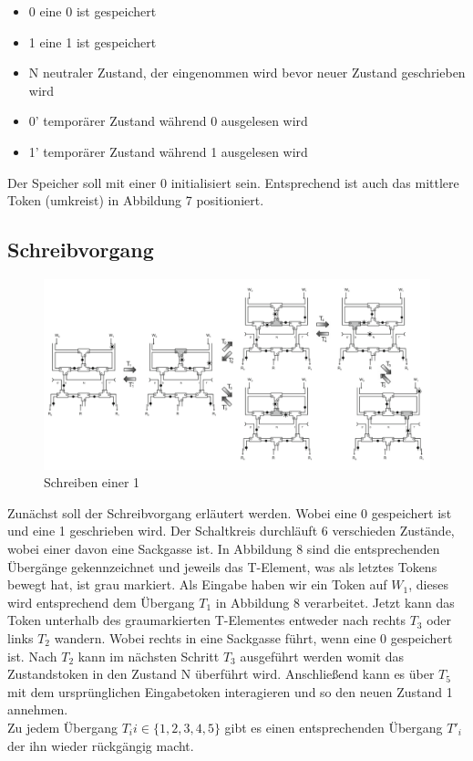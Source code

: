 \documentclass[11pt,a4paper]{article}
\begin{document}
\begin{itemize}
    \item 0 eine 0 ist gespeichert
    \item 1 eine 1 ist gespeichert 
    \item N neutraler Zustand, der eingenommen wird bevor
        neuer Zustand geschrieben wird
    \item 0' temporärer Zustand während 0 ausgelesen wird
    \item 1' temporärer Zustand während 1 ausgelesen wird
\end{itemize}

Der Speicher soll mit einer 0 initialisiert sein.
%
Entsprechend ist auch das mittlere Token (umkreist) in Abbildung 7 positioniert.


\subsection{Schreibvorgang}

\begin{figure}[h]
      \includegraphics[width=14cm]{bilder/write1Mem.png} 
      \caption{Schreiben einer 1}
\end{figure}

Zunächst soll der Schreibvorgang erläutert werden.
%
Wobei eine 0 gespeichert ist und eine 1 geschrieben wird.
%
Der Schaltkreis durchläuft 6 verschieden Zustände, wobei einer 
davon eine Sackgasse ist.
%
In Abbildung 8 sind die entsprechenden Übergänge gekennzeichnet 
und jeweils das T-Element, was als letztes Tokens bewegt hat, ist grau markiert.
%
Als Eingabe haben wir ein Token auf $ W_{1} $, dieses wird entsprechend 
dem Übergang $ T_{1} $ in Abbildung 8 verarbeitet.
%
Jetzt kann das Token unterhalb des graumarkierten T-Elementes entweder
nach rechts $ T_{3} $ oder links $ T_{2} $ wandern. 
%
Wobei rechts in eine Sackgasse führt, wenn eine 0 gespeichert ist.
%
Nach $ T_{2} $ kann im nächsten Schritt $ T_{3} $ ausgeführt werden
womit das Zustandstoken in den Zustand N überführt wird.
%
Anschließend kann es über $ T_{5} $ mit dem ursprünglichen Eingabetoken
interagieren und so den neuen Zustand 1 annehmen. \\
%
Zu jedem Übergang $ T_{i} i \in \{1, 2, 3, 4, 5\} $ gibt es einen 
entsprechenden Übergang $ T'_{i} $ der ihn wieder rückgängig macht.
\end{document}
